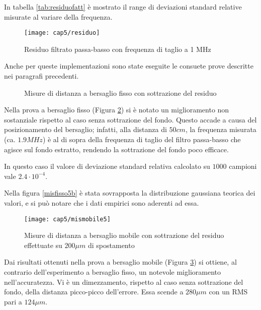 In tabella \ref{tab:residuofatt} è mostrato il range di deviazioni standard relative misurate al variare della frequenza.
\begin{figure}  
  \begin{center}
    \texttt{[image: cap5/residuo]}
    \caption{Residuo filtrato passa-basso con frequenza di taglio a 1 MHz}
    \label{residuo}
  \end{center}
\end{figure}

Anche per queste implementazioni sono state eseguite le consuete prove descritte nei paragrafi precedenti.
\begin{figure}
\centering
{}
\hspace{5mm}
\caption{Misure di distanza a bersaglio fisso con sottrazione del residuo}\label{misfisso5}
\end{figure}

Nella prova a bersaglio fisso (Figura \ref{misfisso5}) si è notato un miglioramento non sostanziale rispetto al caso senza sottrazione del fondo. Questo accade a causa del posizionamento del bersaglio; infatti, alla distanza di $50 cm$, la frequenza misurata (ca. $1.9MHz$) è al di sopra della frequenza di taglio del filtro passa-basso che agisce sul fondo estratto, rendendo la sottrazione del fondo poco efficace.

In questo caso il valore di deviazione standard relativa calcolato su $1000$ campioni vale $2.4 \cdot 10^{-4}$.

Nella figura \ref{misfisso5b} è stata sovrapposta la distribuzione gaussiana teorica dei valori, e si può notare che i dati empirici sono aderenti ad essa.

\begin{figure}  
  \begin{center}
    \texttt{[image: cap5/mismobile5]}
    \caption{Misure di distanza a bersaglio mobile con sottrazione del residuo effettuate su $200 \mu m$ di spostamento}
    \label{mismobile5}
  \end{center}
\end{figure}

Dai risultati ottenuti nella prova a bersaglio mobile (Figura \ref{mismobile5}) si ottiene, al contrario dell'esperimento a bersaglio fisso, un notevole miglioramento nell'accuratezza. Vi è un dimezzamento, rispetto al caso senza sottrazione del fondo, della distanza picco-picco dell'errore. Essa scende a $280 \mu m$ con un RMS pari a $124 \mu m$.

